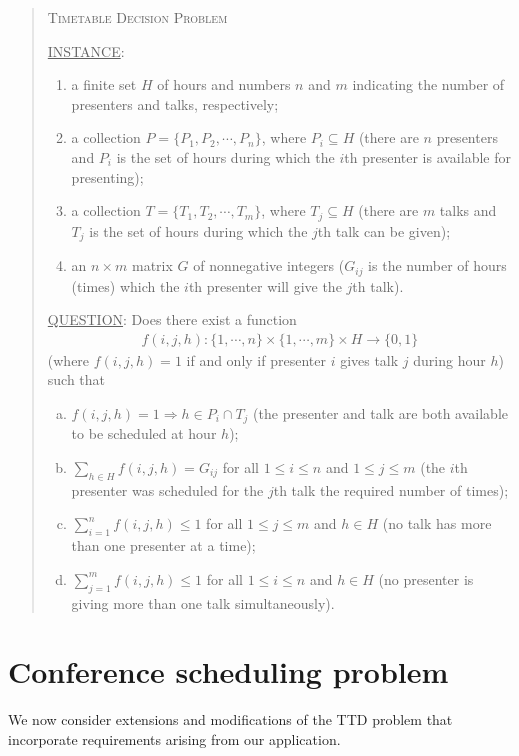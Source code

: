 \documentclass{svjour3}                     %
\begin{document}
\begin{quote}
	\textsc{Timetable Decision Problem}
	
	\underline{INSTANCE}:
	\begin{enumerate}
		\item a finite set $H$ of hours and numbers $n$ and $m$ indicating the number of presenters and talks, respectively; 
		\item a collection $P = \{P_1, P_2, \cdots, P_n\}$, where $P_i \subseteq H$ (there are $n$ presenters and $P_i$ is the set of hours during which the $i$th presenter is available for presenting);
		\item a collection $T = \{T_1, T_2, \cdots, T_m\}$, where $T_j \subseteq H$ (there are $m$ talks and $T_j$ is the set of hours during which the $j$th talk can be given);
		\item an $n \times m$ matrix $G$ of nonnegative integers ($G_{ij}$ is the number of hours (times) which the $i$th presenter will give the $j$th talk).
	\end{enumerate}
	\underline{QUESTION}: Does there exist a function 
	\begin{gather*}
		f(i,j,h) : \{1,\cdots,n\} \times \{1,\cdots,m\} \times H \rightarrow \{0,1\}
	\end{gather*}
	(where $f(i,j,h)=1$ if and only if presenter $i$ gives talk $j$ during hour $h$) such that
	\begin{enumerate}[(a)]
		\item $f(i,j,h) = 1 \Rightarrow h \in P_i \cap T_j$ (the presenter and talk are both available to be scheduled at hour $h$);
		\item $\sum\limits_{h \in H} f(i,j,h) = G_{ij}$ for all $1 \le i \le n$ and $1 \le j \le m$ (the $i$th presenter was scheduled for the $j$th talk the required number of times);
		\item $\sum\limits_{i=1}^n f(i,j,h) \le 1$ for all $1 \le j \le m$ and $h \in H$ (no talk has more than one presenter at a time);
		\item $\sum\limits_{j=1}^m f(i,j,h) \le 1$ for all $1 \le i \le n$ and $h \in H$ (no presenter is giving more than one talk simultaneously).
	\end{enumerate}
\end{quote}


\section{Conference scheduling problem}\label{sec.desc}
We now consider extensions and modifications of the TTD problem that incorporate requirements arising from our application.
\end{document}
